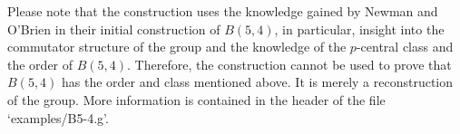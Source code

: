 Please note that the construction uses the knowledge gained by Newman and
O'Brien in their  initial  construction  of  $B(5,  4)$,  in  particular,
insight into the commutator structure of the group and the  knowledge  of
the $p$-central  class  and  the  order  of  $B(5,  4)$.  Therefore,  the
construction cannot be used to prove that $B(5, 4)$  has  the  order  and
class mentioned above. It is merely a reconstruction of the  group.  More
information is contained in the header of the file `examples/B5-4.g'.

